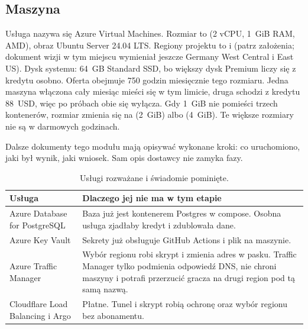 \subsection{Maszyna}
Usługa nazywa się Azure Virtual Machines. Rozmiar to 
(2 vCPU, 1~GiB RAM, AMD), obraz Ubuntu Server 24.04 LTS. Regiony projektu to
 i  (patrz założenia; dokument wizji w tym
miejscu wymieniał jeszcze Germany West Central i East US). Dysk systemu: 64~GB
Standard SSD, bo większy dysk Premium liczy się z kredytu osobno. Oferta obejmuje
750 godzin miesięcznie tego rozmiaru. Jedna maszyna włączona cały miesiąc mieści się
w tym limicie, druga schodzi z kredytu 88~USD, więc po próbach obie się wyłącza. Gdy
1~GiB nie pomieści trzech kontenerów, rozmiar zmienia się na 
(2~GiB) albo  (4~GiB). Te większe rozmiary nie są w darmowych
godzinach.

Dalsze dokumenty tego modułu mają opisywać wykonane kroki: co uruchomiono, jaki
był wynik, jaki wniosek. Sam opis dostawcy nie zamyka fazy.

\begin{table}[H]
\centering\footnotesize
\begin{tabularx}{\textwidth}{@{}lY@{}}
\toprule
\textbf{Usługa} & \textbf{Dlaczego jej nie ma w tym etapie} \\
\midrule
Azure Database for PostgreSQL & Baza już jest kontenerem Postgres w compose. Osobna usługa zjadłaby kredyt i zdublowała dane. \\
Azure Key Vault & Sekrety już obsługuje GitHub Actions i plik na maszynie. \\
Azure Traffic Manager & Wybór regionu robi skrypt i zmienia adres w pasku. Traffic Manager tylko podmienia odpowiedź DNS, nie chroni maszyny i potrafi przerzucić gracza na drugi region pod tą samą nazwą. \\
Cloudflare Load Balancing i Argo & Płatne. Tunel i skrypt robią ochronę oraz wybór regionu bez abonamentu. \\
\bottomrule
\end{tabularx}
\caption{Usługi rozważane i świadomie pominięte.}
\label{tab:wizja-mapa}
\end{table}

